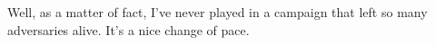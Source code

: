 Well, as a matter of fact, I've never played in a campaign that left so many adversaries alive. It's a nice change of pace.\\

